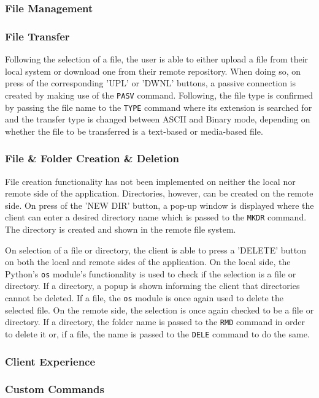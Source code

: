 \documentclass[10pt,twocolumn]{witseiepaper}
\begin{document}
\subsubsection{File Management}
\subsubsection*{File Transfer}
Following the selection of a file, the user is able to either upload a file from their local system or download one from their remote repository. When doing so, on press of the corresponding 'UPL' or 'DWNL' buttons, a passive connection is created by making use of the \texttt{PASV} command. Following, the file type is confirmed by passing the file name to the \texttt{TYPE} command where its extension is searched for and the transfer type is changed between ASCII and Binary mode, depending on whether the file to be transferred is a text-based or media-based file.

\subsubsection*{File \& Folder Creation \& Deletion}
File creation functionality has not been implemented on neither the local nor remote side of the application. Directories, however, can be created on the remote side. On press of the 'NEW DIR' button, a pop-up window is displayed where the client can enter a desired directory name which is passed to the \texttt{MKDR} command. The directory is created and shown in the remote file system. 

On selection of a file or directory, the client is able to press a 'DELETE' button on both the local and remote sides of the application. On the local side, the Python's \texttt{os} module's functionality is used to check if the selection is a file or directory. If a directory, a popup is shown informing the client that directories cannot be deleted. If a file, the \texttt{os} module is once again used to delete the selected file. On the remote side, the selection is once again checked to be a file or directory. If a directory, the folder name is passed to the \texttt{RMD} command in order to delete it or, if a file, the name is passed to the \texttt{DELE} command to do the same.

\subsubsection{Client Experience}
\subsubsection*{Custom Commands}
\end{document}
